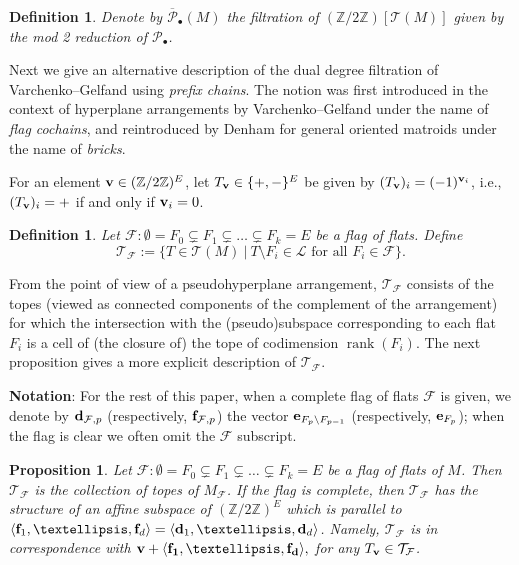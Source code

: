\documentclass{amsart}
\newtheorem{proposition}[theorem]{Proposition}
\newtheorem{definition}[theorem]{Definition}
\newcommand\Fcal{{\mathcal F}}
\newcommand\Pcal{{\mathcal P}}
\newcommand\Tcal{{\mathcal T}}
\newcommand\dd{{\bf d}}
\newcommand\ee{{\bf e}}
\newcommand\ff{{\bf f}}
\newcommand\Ztwo{{\mathbb Z}/2{\mathbb Z}}
\DeclareMathOperator{\rank}{rank}
\begin{document}
{\begin{definition}
Denote by $\overline{\Pcal}_\bullet(M)$ the filtration of $(\Ztwo)[\Tcal(M)]$ given by the mod 2 reduction of $\Pcal_\bullet$.
\end{definition}

Next we give an alternative description of the dual degree filtration of Varchenko--Gelfand using {\em prefix chains}.
The notion was first introduced in the context of hyperplane arrangements by Varchenko--Gelfand under the name of {\em flag cochains}, and reintroduced by Denham for general oriented matroids under the name of {\em bricks}.

For an element ${\bf v} \in (\Ztwo)^E$, let $T_{{\bf v}} \in \{+,-\}^E$ be given by $(T_{\bf v})_i = (-1)^{{\bf v}_i}$, i.e., $(T_{\bf v})_i=+$ if and only if ${\bf v}_i=0$.

\begin{definition}\label{def:tope_flag}
Let $\Fcal:\emptyset=F_0 \subsetneq  F_1 \subsetneq \ldots \subsetneq  F_k=E$ be a flag of flats.
Define 
$$\Tcal_\Fcal := \{ T \in \mathcal{T}(M) \ | \ T\setminus F_i \in \mathcal{L} \text{ for all } F_i \in \mathcal{F}\}. $$ 
\end{definition}

From the point of view of a pseudohyperplane arrangement, $\Tcal_\Fcal$ consists of the topes (viewed as connected components of the complement of the arrangement) for which the intersection with the (pseudo)subspace corresponding to each flat $F_i$ is a cell of (the closure of) the tope of codimension $\rank(F_i)$.
The next proposition gives a more explicit description of $\Tcal_\Fcal$.

{\sc\bf Notation}: For the rest of this paper, when a complete flag of flats $\Fcal$ is given, we denote by $\dd_{\Fcal,p}$ (respectively, $\ff_{\Fcal, p}$) the vector $\ee_{F_p\setminus F_{p-1}}$ (respectively, $\ee_{F_p}$); when the flag is clear we often omit the $\Fcal$ subscript.

\begin{proposition} \label{prop:T_F_structure} \cite[Lemma 3.2]{RRS}
Let $\Fcal:\emptyset=F_0\subsetneq  F_1 \subsetneq \ldots \subsetneq F_k=E$ be a flag of flats of $M$. Then $\Tcal_\Fcal$ is the collection of topes of $M_\Fcal$.
If the flag is complete, then $\Tcal_\Fcal$ has the structure of an affine subspace of $(\Ztwo)^E$ which is parallel to $\langle \ff_1, \dots, \ff_d\rangle=\langle \dd_1, \dots, \dd_d\rangle$.
Namely, $\Tcal_\Fcal$ is in correspondence with $\bf v + \langle \ff_1, \dots, \ff_d\rangle,$
for any $T_{\bf v} \in \Tcal_\Fcal$. 
\end{proposition}

}
\end{document}
